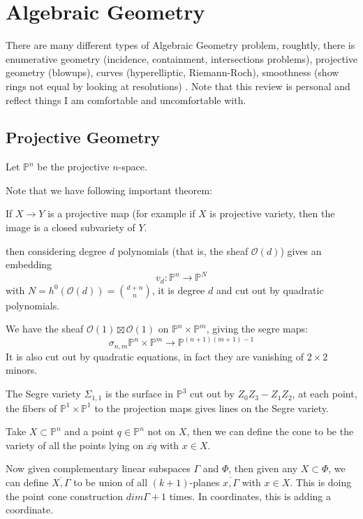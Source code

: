 \documentclass[main.tex]{subfiles}
\newcommand{\Pn}[1]{\mathbb{P}^{#1}}
\begin{document}
\section{Algebraic Geometry}
There are many different types of Algebraic Geometry problem, roughtly, there is enumerative geometry (incidence, containment, intersections problems), projective geometry (blowups), curves (hyperelliptic, Riemann-Roch), smoothness (show rings not equal by looking at resolutions) . Note that this review is personal and reflect things I am comfortable and uncomfortable with.


\subsection{Projective Geometry}
Let $\mathbb{P}^n$ be the projective $n$-space.

Note that we have following important theorem:
\begin{theorem}
If $X \rightarrow Y$ is a projective map (for example if $X$ is projective variety, then the image is a closed subvariety of $Y$.
\end{theorem}

\begin{example}
then considering degree $d$ polynomials (that is, the sheaf $\mathcal{O}(d)$) gives an embedding
$$
v_d: \mathbb{P}^n \rightarrow \mathbb{P}^N
$$
with $N = h^0(\mathcal{O}(d)) = \binom{d+n}{n}$, it is degree $d$ and cut out by quadratic polynomials. 
\end{example}

\begin{example}
We have the sheaf $\mathcal{O}(1) \boxtimes \mathcal{O}(1)$ on $\mathbb{P}^n \times \mathbb{P}^m$, giving the segre maps:
$$
\sigma_{n,m} \mathbb{P}^n \times \mathbb{P}^m \rightarrow \mathbb{P}^{(n+1)(m+1) - 1}
$$
It is also cut out by quadratic equations, in fact they are vanishing of $2\times 2 $minors. 
\end{example}

The Segre variety $\Sigma_{1,1}$ is the surface in $\mathbb{P}^3$ cut out by $Z_0 Z_3 - Z_1 Z_2$, at each point, the fibers of $\mathbb{P}^1 \times \mathbb{P}^1$ to the projection maps gives lines on the Segre variety.

\begin{example}[Cones]
Take $X \subset \Pn{n}$ and a point $q \in \Pn{n}$ not on $X$, then we can define the cone to be the variety of all the points lying on $\overline{xq}$ with $x \in X$. 

Now given complementary linear subspaces $\Gamma$ and $\Phi$, then given any $X \subset \Phi$, we can define $\overline{X, \Gamma}$ to be union of all $(k+1)$-planes $\overline{x, \Gamma}$ with $x \in X$. This is doing the point cone construction $dim \Gamma + 1$ times. In coordinates, this is adding a coordinate. 
\end{example}
\end{document}
